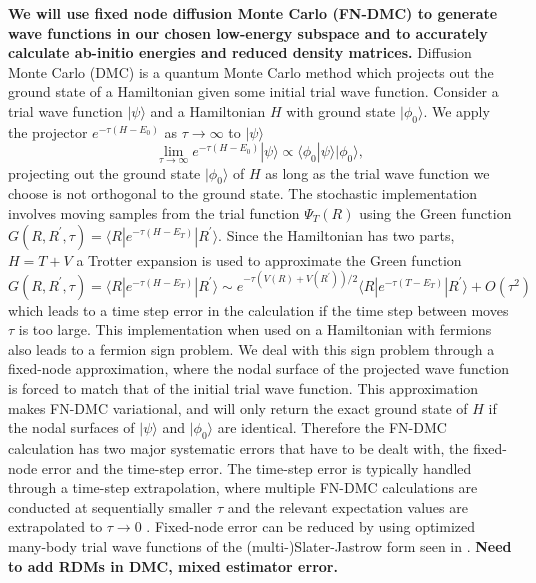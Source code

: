 \documentclass{article}
\begin{document}
\textbf{We will use fixed node diffusion Monte Carlo (FN-DMC) to generate
wave functions in our chosen low-energy subspace and to accurately calculate ab-initio energies and reduced density matrices. }
Diffusion Monte Carlo (DMC) is a quantum Monte Carlo method which projects out the ground state of a Hamiltonian given some initial trial wave function. 
Consider a trial wave function $|\psi\rangle$ and a Hamiltonian $H$ with ground state $|\phi_0\rangle$. 
We apply the projector $e^{-\tau (H-E_0)}$ as $\tau \rightarrow \infty$ to $|\psi \rangle$
\begin{equation}
\lim_{\tau \rightarrow \infty} e^{-\tau (H-E_0)} |\psi\rangle \propto \langle \phi_0|\psi\rangle |\phi_0\rangle,
\end{equation}
projecting out the ground state $|\phi_0\rangle$ of $H$ as long as the trial wave function we choose is not orthogonal to the ground state. 
The stochastic implementation involves moving samples from the trial function $\Psi_T(R)$ using the Green function $G(R, R^\prime, \tau) = \langle R | e^{-\tau(H - E_T)} | R^\prime \rangle$. 
Since the Hamiltonian has two parts, $H = T + V$ a Trotter expansion is used to approximate the Green function $G(R, R^\prime, \tau) = \langle R | e^{-\tau(H - E_T)} | R^\prime \rangle \sim e^{-\tau(V(R) + V(R^\prime))/2} \langle R| e^{-\tau(T - E_T)}|R^\prime \rangle + O(\tau^2) $ which leads to a time step error in the calculation if the time step between moves $\tau$ is too large. 
This implementation when used on a Hamiltonian with fermions also leads to a fermion sign problem. 
We deal with this sign problem through a fixed-node approximation, where the nodal surface of the projected wave function is forced to match that of the initial trial wave function. 
This approximation makes FN-DMC variational, and will only return the exact ground state of $H$ if the nodal surfaces of $|\psi\rangle$ and $|\phi_0\rangle$ are identical. 
Therefore the FN-DMC calculation has two major systematic errors that have to be dealt with, the fixed-node error and the time-step error. 
The time-step error is typically handled through a time-step extrapolation, where multiple FN-DMC calculations are conducted at sequentially smaller $\tau$ and the relevant expectation values are extrapolated to $\tau \rightarrow 0$ \cite{Needs2010}. 
Fixed-node error can be reduced by using optimized many-body trial wave functions of the (multi-)Slater-Jastrow form seen in \cite{PhysRevLett.98.110201}.
\textbf{Need to add RDMs in DMC, mixed estimator error.}
\end{document}
